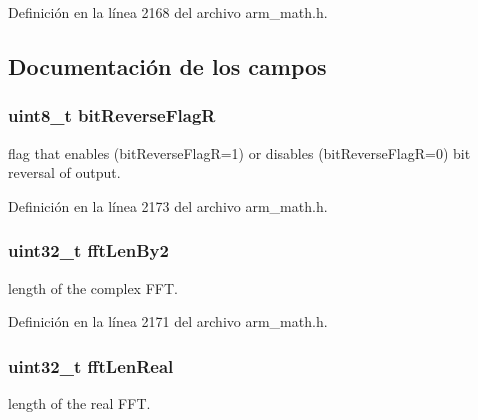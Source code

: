 Definición en la línea 2168 del archivo arm\+\_\+math.\+h.



\subsection{Documentación de los campos}
\subsubsection[{\texorpdfstring{bit\+Reverse\+FlagR}{bitReverseFlagR}}]{\setlength{\rightskip}{0pt plus 5cm}uint8\+\_\+t bit\+Reverse\+FlagR}\hypertarget{structarm__rfft__instance__q31_ad56ec2425e2422108b8767b43d944591}{}\label{structarm__rfft__instance__q31_ad56ec2425e2422108b8767b43d944591}
flag that enables (bit\+Reverse\+FlagR=1) or disables (bit\+Reverse\+FlagR=0) bit reversal of output. 

Definición en la línea 2173 del archivo arm\+\_\+math.\+h.

\subsubsection[{\texorpdfstring{fft\+Len\+By2}{fftLenBy2}}]{\setlength{\rightskip}{0pt plus 5cm}uint32\+\_\+t fft\+Len\+By2}\hypertarget{structarm__rfft__instance__q31_ae7db13e0e2999656d98c4223de5b1284}{}\label{structarm__rfft__instance__q31_ae7db13e0e2999656d98c4223de5b1284}
length of the complex F\+FT. 

Definición en la línea 2171 del archivo arm\+\_\+math.\+h.

\subsubsection[{\texorpdfstring{fft\+Len\+Real}{fftLenReal}}]{\setlength{\rightskip}{0pt plus 5cm}uint32\+\_\+t fft\+Len\+Real}\hypertarget{structarm__rfft__instance__q31_adf0d4604cf5546075d9d4cf122d6c986}{}\label{structarm__rfft__instance__q31_adf0d4604cf5546075d9d4cf122d6c986}
length of the real F\+FT. 

